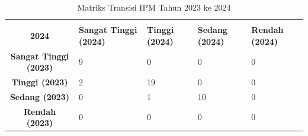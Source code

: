 \begin{table}[H]
\centering
\caption{Matriks Transisi IPM Tahun 2023 ke 2024} \label{tab:ipm_transisi_2023_2024}
\begin{tabular}{|c|p{2cm}|p{2cm}|p{2cm}|p{2cm}|}
\hline
\makecell{\textbf{Tahun 2023} \\ \textbf{2024}} & \textbf{Sangat Tinggi (2024)} & \textbf{Tinggi (2024)} & \textbf{Sedang (2024)} & \textbf{Rendah (2024)} \\ \hline
\textbf{Sangat Tinggi (2023)} & 9 & 0 & 0 & 0 \\ \hline
\textbf{Tinggi (2023)} & 2 & 19 & 0 & 0 \\ \hline
\textbf{Sedang (2023)} & 0 & 1 & 10 & 0 \\ \hline
\textbf{Rendah (2023)} & 0 & 0 & 0 & 0 \\ \hline
\end{tabular}
\end{table}